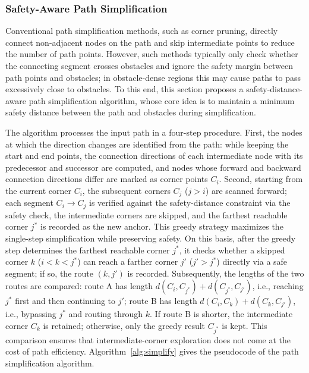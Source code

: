 \documentclass[pdflatex,sn-basic,Numbered]{sn-jnl}
\begin{document}
\subsubsection{Safety-Aware Path Simplification}

Conventional path simplification methods, such as corner pruning, directly connect non-adjacent nodes on the path and skip intermediate points to reduce the number of path points. However, such methods typically only check whether the connecting segment crosses obstacles and ignore the safety margin between path points and obstacles; in obstacle-dense regions this may cause paths to pass excessively close to obstacles. To this end, this section proposes a safety-distance-aware path simplification algorithm, whose core idea is to maintain a minimum safety distance between the path and obstacles during simplification.

The algorithm processes the input path in a four-step procedure. First, the nodes at which the direction changes are identified from the path: while keeping the start and end points, the connection directions of each intermediate node with its predecessor and successor are computed, and nodes whose forward and backward connection directions differ are marked as corner points $C_i$. Second, starting from the current corner $C_i$, the subsequent corners $C_j$ ($j > i$) are scanned forward; each segment $C_i \to C_j$ is verified against the safety-distance constraint via the safety check, the intermediate corners are skipped, and the farthest reachable corner $j^{*}$ is recorded as the new anchor. This greedy strategy maximizes the single-step simplification while preserving safety. On this basis, after the greedy step determines the farthest reachable corner $j^{*}$, it checks whether a skipped corner $k$ ($i < k < j^{*}$) can reach a farther corner $j'$ ($j' > j^{*}$) directly via a safe segment; if so, the route $(k, j')$ is recorded. Subsequently, the lengths of the two routes are compared: route A has length $d(C_i, C_{j^{*}}) + d(C_{j^{*}}, C_{j'})$, i.e., reaching $j^{*}$ first and then continuing to $j'$; route B has length $d(C_i, C_k) + d(C_k, C_{j'})$, i.e., bypassing $j^{*}$ and routing through $k$. If route B is shorter, the intermediate corner $C_k$ is retained; otherwise, only the greedy result $C_{j^{*}}$ is kept. This comparison ensures that intermediate-corner exploration does not come at the cost of path efficiency. Algorithm~\ref{alg:simplify} gives the pseudocode of the path simplification algorithm.
\end{document}
